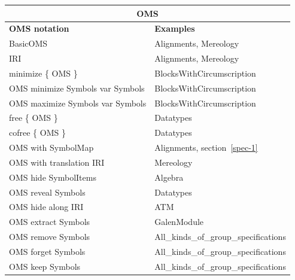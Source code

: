 \documentclass[10pt,fleqn,%
\ifpretendfinal
final%
\else
draft%
\fi,
]{scrreprt}
\begin{document}
\begin{tabular}{|l|l|}\hline
\multicolumn{2}{|c|}{\textbf{OMS}}\\\hline
\textbf{OMS notation} & \textbf{Examples} \\\hline
BasicOMS  & Alignments, Mereology \\\hline
IRI  & Alignments, Mereology \\\hline
minimize \{ OMS \}  & BlocksWithCircumscription \\\hline
OMS minimize Symbols var Symbols  & BlocksWithCircumscription \\\hline
OMS maximize Symbols var Symbols  & BlocksWithCircumscription \\\hline
free \{ OMS \} & Datatypes \\\hline
cofree \{ OMS \} & Datatypes \\\hline
OMS with SymbolMap  & Alignments,  section~\ref{spec-1} \\\hline
OMS with translation IRI  & Mereology \\\hline
OMS hide SymbolItems  &  Algebra \\\hline
OMS reveal Symbols  & Datatypes \\\hline
OMS hide along IRI  & ATM \\\hline
OMS extract Symbols  & GalenModule \\\hline
OMS remove Symbols  & All\_kinds\_of\_group\_specifications \\\hline
OMS forget Symbols  & All\_kinds\_of\_group\_specifications \\\hline
OMS keep Symbols  & All\_kinds\_of\_group\_specifications \\\hline

\end{tabular}
\end{document}
